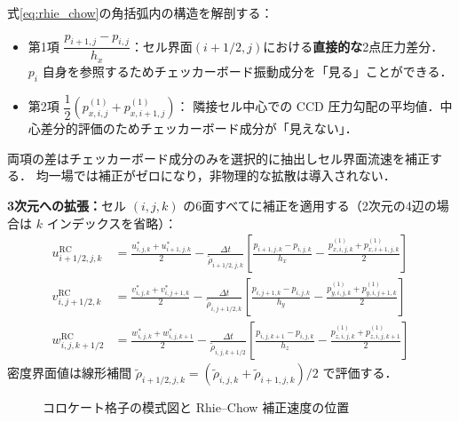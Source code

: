 \documentclass[12pt, a4paper, titlepage]{article}
\newcommand{\jp}[1]{{\normalfont\jpfont #1}}
\begin{document}
\jp{式\eqref{eq:rhie_chow}の角括弧内の構造を解剖する：}
\begin{itemize}
  \item \jp{第1項 $\dfrac{p_{i+1,j}-p_{i,j}}{h_x}$：セル界面$(i+1/2,j)$における\textbf{直接的な}2点圧力差分．
       $p_i$ 自身を参照するためチェッカーボード振動成分を「見る」ことができる．}
  \item \jp{第2項 $\dfrac{1}{2}(p^{(1)}_{x,i,j}+p^{(1)}_{x,i+1,j})$：
     隣接セル中心での CCD 圧力勾配の平均値．中心差分的評価のためチェッカーボード成分が「見えない」．}
\end{itemize}
\jp{両項の差はチェッカーボード成分のみを選択的に抽出しセル界面流速を補正する．
均一場では補正がゼロになり，非物理的な拡散は導入されない．}

\jp{\textbf{3次元への拡張：}セル $(i,j,k)$ の6面すべてに補正を適用する（2次元の4辺の場合は $k$ インデックスを省略）：}
\begin{align}
  u_{i+1/2,j,k}^{\mathrm{RC}} &= \frac{u^*_{i,j,k}+u^*_{i+1,j,k}}{2}
    - \frac{\Delta t}{\tilde\rho_{i+1/2,j,k}}\!\left[\frac{p_{i+1,j,k}-p_{i,j,k}}{h_x}
      -\frac{p^{(1)}_{x,i,j,k}+p^{(1)}_{x,i+1,j,k}}{2}\right]\label{eq:rhie_chow_u}\\[3pt]
  v_{i,j+1/2,k}^{\mathrm{RC}} &= \frac{v^*_{i,j,k}+v^*_{i,j+1,k}}{2}
    - \frac{\Delta t}{\tilde\rho_{i,j+1/2,k}}\!\left[\frac{p_{i,j+1,k}-p_{i,j,k}}{h_y}
      -\frac{p^{(1)}_{y,i,j,k}+p^{(1)}_{y,i,j+1,k}}{2}\right]\label{eq:rhie_chow_v}\\[3pt]
  w_{i,j,k+1/2}^{\mathrm{RC}} &= \frac{w^*_{i,j,k}+w^*_{i,j,k+1}}{2}
    - \frac{\Delta t}{\tilde\rho_{i,j,k+1/2}}\!\left[\frac{p_{i,j,k+1}-p_{i,j,k}}{h_z}
      -\frac{p^{(1)}_{z,i,j,k}+p^{(1)}_{z,i,j,k+1}}{2}\right]\label{eq:rhie_chow_w}
\end{align}
\jp{密度界面値は線形補間 $\tilde\rho_{i+1/2,j,k}=(\tilde\rho_{i,j,k}+\tilde\rho_{i+1,j,k})/2$ で評価する．}

\begin{figure}[h]
\centering
{}
\caption{\jp{コロケート格子の模式図と Rhie--Chow 補正速度の位置}}
\label{fig:collocate}
\end{figure}
\end{document}
